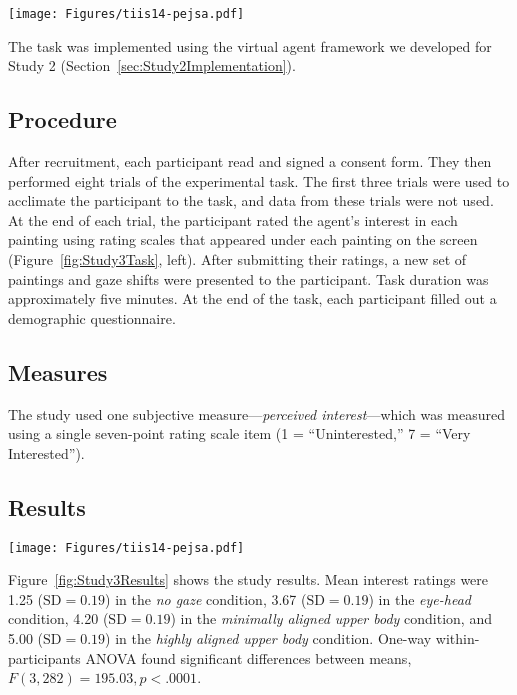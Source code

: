 \begin{figure*}
\centering
\texttt{[image: Figures/tiis14-pejsa.pdf]}
\caption{Experimental task in Study 3. Left: Task interface. Right: An experimenter demonstrating the task.}
\label{fig:Study3Task}
\end{figure*}

The task was implemented using the virtual agent framework we developed for Study 2 (Section~\ref{sec:Study2Implementation}).

\subsection{Procedure}

After recruitment, each participant read and signed a consent form. They then performed eight trials of the experimental task. The first three trials were used to acclimate the participant to the task, and data from these trials were not used. At the end of each trial, the participant rated the agent's interest in each painting using rating scales that appeared under each painting on the screen (Figure~\ref{fig:Study3Task}, left). After submitting their ratings, a new set of paintings and gaze shifts were presented to the participant. Task duration was approximately five minutes. At the end of the task, each participant filled out a demographic questionnaire.

\subsection{Measures}

The study used one subjective measure---\emph{perceived interest}---which was measured using a single seven-point rating scale item (1 = ``Uninterested,'' 7 = ``Very Interested'').

\subsection{Results}

\begin{figure*}[b]
\centering
\texttt{[image: Figures/tiis14-pejsa.pdf]}
\caption{Results for perceived interest ratings for each type of gaze shift. Results for gaze shifts with upper body movement are shown in red.}
\label{fig:Study3Results}
\end{figure*}

Figure~\ref{fig:Study3Results} shows the study results. Mean interest ratings were 1.25 ($\mathrm{SD} = 0.19$) in the \emph{no gaze} condition, 3.67 ($\mathrm{SD} = 0.19$) in the \emph{eye-head} condition, 4.20 ($\mathrm{SD} = 0.19$) in the \emph{minimally aligned upper body} condition, and 5.00 ($\mathrm{SD} = 0.19$) in the \emph{highly aligned upper body} condition. One-way within-participants ANOVA found significant differences between means, $F(3, 282) = 195.03, p < .0001$.

